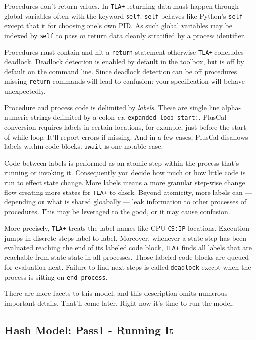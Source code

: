 \documentclass[twocolumn]{article}
\begin{document}
Procedures don't return values. In \texttt{TLA+} returning data must happen through global variables often with the keyword \texttt{self}. \texttt{self} behaves like Python's \texttt{self} except that it for choosing one's own PID. As such global variables may be indexed by \texttt{self} to pass or return data cleanly stratified by a process identifier.

Procedures must contain and hit a \texttt{return} statement otherwise \texttt{TLA+} concludes deadlock. Deadlock detection is enabled by default in the toolbox, but is off by default on the command line. Since deadlock detection can be off procedures missing \texttt{return} commands will lead to confusion: your specification will behave unexpectedly. 

Procedure and process code is delimited by \emph{labels}. These are single line alpha-numeric strings delimited by a colon \emph{ex.} \texttt{expanded\_loop\_start:}. PlusCal conversion requires labels in certain locations, for example, just before the start of while loop. It'll report errors if missing. And in a few cases, PlusCal disallows labels within code blocks. \texttt{await} is one notable case.

Code between labels is performed as an atomic step within the process that's running or invoking it. Consequently you decide how much or how little code is run to effect state change. More labels means a more granular step-wise change flow creating more states for \texttt{TLA+} to check. Beyond atomicity, more labels can --- depending on what is shared gloabally --- leak information to other processes of procedures. This may be leveraged to the good, or it may cause confusion.

More precisely, \texttt{TLA+} treats the label names like CPU \texttt{CS:IP} locations. Execution jumps in discrete steps label to label. Moreover, whenever a state step has been evaluated reaching the end of its labeled code block, \texttt{TLA+} finds all labels that are reachable from state state in all processes. Those labeled code blocks are queued for evaluation next. Failure to find next steps is called \texttt{deadlock} except when the process is sitting on \texttt{end process}. 

There are more facets to this model, and this description omits numerous important details. That'll come later. Right now it's time to run the model.

\subsection{Hash Model: Pass1 - Running It}
\end{document}
